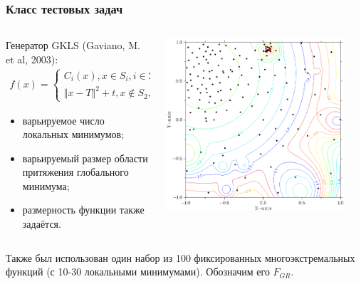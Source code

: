 \documentclass[aspectratio=1610]{beamer}
\begin{document}
\begin{frame}
  \frametitle{Класс тестовых задач}
  \begin{columns}
    \begin{column}{0.5\textwidth}
      Генератор GKLS (Gaviano, M. et al, 2003):
      \begin{displaymath}
        \begin{matrix}
          f(x)=
          \left\{
          \begin{matrix}
          C_i(x), x \in S_i, i\in 2,\dots ,m \\
          \Vert x-T \Vert^2 + t, x\not\in S_2,\dots,S_m
          \end{matrix} \right.
        \end{matrix}
      \end{displaymath}

      \begin{itemize}
        \item варьируемое число локальных минимумов;
        \item варьируемый размер области притяжения глобального минимума;
        \item размерность функции также задаётся.
      \end{itemize}
    \end{column}
    \begin{column}{0.5\textwidth}
      \centerline{\includegraphics[width=0.9\textwidth]{gkls_color.png}}
    \end{column}
  \end{columns}
  Также был использован один набор из 100 фиксированных многоэкстремальных функций (с 10-30 локальными минимумами). Обозначим его \(F_{GR}\).
\end{frame}
\end{document}
